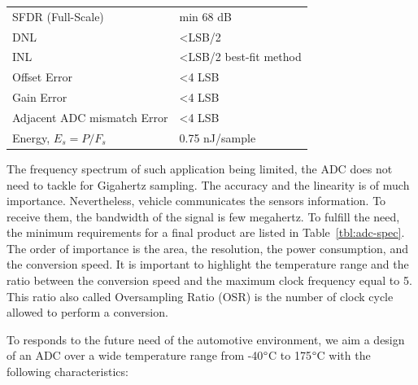 \begin{table}[htp]
\begin{tabular}{ll}
		SFDR (Full-Scale)                & min 68 dB                                                                                               \\
		DNL                              & \textless LSB/2                                                                                       \\
		INL                              & \textless LSB/2 best-fit method                                                                                    \\
		Offset Error                     & \textless 4 LSB                                                                                                                                             \\
		Gain Error                       & \textless 4 LSB                                                                                                                                             \\
		Adjacent ADC mismatch Error      & \textless 4 LSB                                                                                                                                             \\
		Energy, $E_s = P/F_s$            & 0.75 nJ/sample      \\ \bottomrule                                                                                                                                       
	\end{tabular}
\end{table}

The frequency spectrum of such application being limited, the ADC does not need to tackle for Gigahertz sampling. The accuracy and the linearity is of much importance. Nevertheless, vehicle communicates the sensors information. To receive them, the bandwidth of the signal is few megahertz.
To fulfill the need, the minimum requirements for a final product are listed in Table~\ref{tbl:adc-spec}. The order of importance is the area, the resolution, the power consumption, and the conversion speed. It is important to highlight the temperature range and the ratio between the conversion speed and the maximum clock frequency equal to 5. This ratio also called Oversampling Ratio (OSR) is the number of clock cycle allowed to perform a conversion.

To responds to the future need of the automotive environment, we aim a design of an ADC over a wide temperature range from -40\(\degree \)C to 175\(\degree \)C with the following characteristics:

